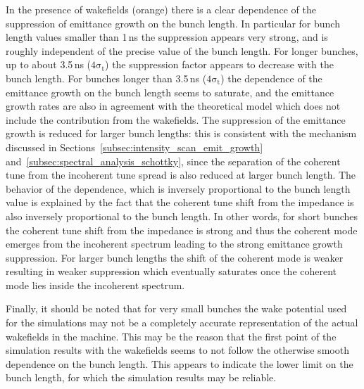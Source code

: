 In the presence of wakefields (orange) there is a clear dependence of the suppression of emittance growth on the bunch length. In particular for bunch length values smaller than 1\,ns the suppression appears very strong, and is roughly independent of the precise value of the bunch length. For longer bunches, up to about 3.5\,ns ($\mathrm{4 \sigma_t}$) the suppression factor appears to decrease with the bunch length. For bunches longer than 3.5\,ns ($\mathrm{4 \sigma_t}$) the dependence of the emittance growth on the bunch length seems to saturate, and the emittance growth rates are also in agreement with the theoretical model which does not include the contribution from the wakefields. The suppression of the emittance growth is reduced for larger bunch lengths: this is consistent with the mechanism discussed in Sections~\ref{subsec:intensity_scan_emit_growth} and~\ref{subsec:spectral_analysis_schottky}, since the separation of the coherent tune from the incoherent tune spread is also reduced at larger bunch length. The behavior of the dependence, which is inversely proportional to the bunch length value is explained by the fact that the coherent tune shift from the impedance is also inversely proportional to the bunch length. In other words, for short bunches the coherent tune shift from the impedance is strong and thus the coherent mode emerges from the incoherent spectrum leading to the strong emittance growth suppression. For larger bunch lengths the shift of the coherent mode is weaker resulting in weaker suppression which eventually saturates once the coherent mode lies inside the incoherent spectrum.

 Finally, it should be noted that for very small bunches the wake potential used for the simulations may not be a completely accurate representation of the actual wakefields in the machine. This may be the reason that the first point of the simulation results with the wakefields seems to not follow the otherwise smooth dependence on the bunch length. This appears to indicate the lower limit on the bunch length, for which the simulation results may be reliable.




